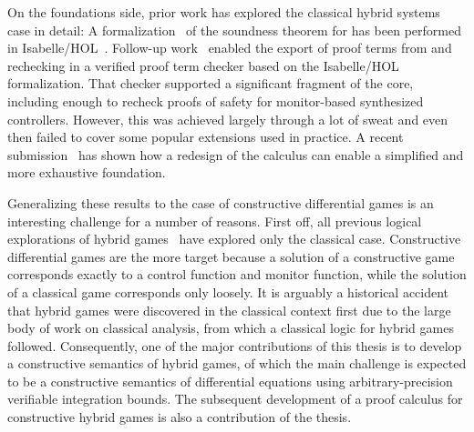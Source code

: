 \documentclass[12pt]{cmuthesis}
\theoremstyle{definition}
\theoremstyle{remark}
\newcommand{\Isabelle}{Isabelle/HOL\xspace}
\begin{document}
On the foundations side, prior work has explored the classical hybrid systems case in detail:
A formalization~\cite{DBLP:conf/cpp/BohrerRVVP17} of the soundness theorem for \dL has been performed in \Isabelle~\cite{DBLP:books/sp/NipkowPW02}.
Follow-up work~\cite{DBLP:conf/pldi/BohrerTMMP18} enabled the export of proof terms from \KeYmaeraX and rechecking in a verified proof term checker based on the \Isabelle formalization.
That checker supported a significant fragment of the \KeYmaeraX core, including enough to recheck proofs of safety for monitor-based synthesized controllers.
However, this was achieved largely through a lot of sweat and even then failed to cover some popular extensions used in practice.
A recent submission~\cite{hilbert-epsilons} has shown how a redesign of the \dL calculus can enable a simplified and more exhaustive foundation.

Generalizing these results to the case of constructive differential games is an interesting challenge for a number of reasons.
First off, all previous logical explorations of hybrid games~\cite{DBLP:conf/cade/QueselP12,DBLP:journals/tocl/Platzer15,DBLP:journals/tocl/Platzer17,DBLP:conf/cade/Platzer18} have explored only the classical case.
Constructive differential games are the more target because a solution of a constructive game corresponds exactly to a control function and monitor function, while the solution of a classical game corresponds only loosely.
It is arguably a historical accident that hybrid games were discovered in the classical context first due to the large body of work on classical analysis, from which a classical logic for hybrid games followed.
Consequently, one of the major contributions of this thesis is to develop a constructive semantics of hybrid games, of which the main challenge is expected to be a constructive semantics of differential equations using arbitrary-precision verifiable integration bounds.
The subsequent development of a proof calculus for constructive hybrid games is also a contribution of the thesis.
\end{document}
